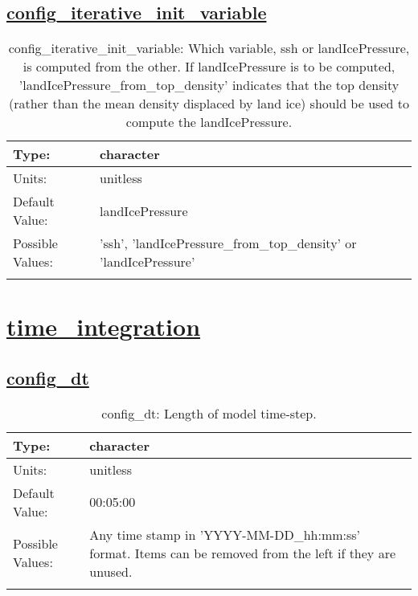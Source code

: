 \subsection[config\_iterative\_init\_variable]{\hyperref[sec:nm_tab_init_ssh_and_landIcePressure]{config\_iterative\_init\_variable}}
\label{subsec:nm_sec_config_iterative_init_variable}
\begin{center}
\begin{longtable}{| p{2.0in} || p{4.0in} |}
    \hline
    Type: & character \\
    \hline
    Units: & \si{unitless} \\
    \hline
    Default Value: & landIcePressure \\
    \hline
    Possible Values: & 'ssh', 'landIcePressure\_from\_top\_density' or 'landIcePressure' \\
    \hline
    \caption{config\_iterative\_init\_variable: Which variable, ssh or landIcePressure, is computed from the other.  If landIcePressure is to be computed, 'landIcePressure\_from\_top\_density' indicates that the top density (rather than the mean density displaced by land ice) should be used to compute the landIcePressure.}
\end{longtable}
\end{center}
\section[time\_integration]{\hyperref[sec:nm_tab_time_integration]{time\_integration}}
\label{sec:nm_sec_time_integration}
\subsection[config\_dt]{\hyperref[sec:nm_tab_time_integration]{config\_dt}}
\label{subsec:nm_sec_config_dt}
\begin{center}
\begin{longtable}{| p{2.0in} || p{4.0in} |}
    \hline
    Type: & character \\
    \hline
    Units: & \si{unitless} \\
    \hline
    Default Value: & 00:05:00 \\
    \hline
    Possible Values: & Any time stamp in 'YYYY-MM-DD\_hh:mm:ss' format. Items can be removed from the left if they are unused. \\
    \hline
    \caption{config\_dt: Length of model time-step.}
\end{longtable}
\end{center}
